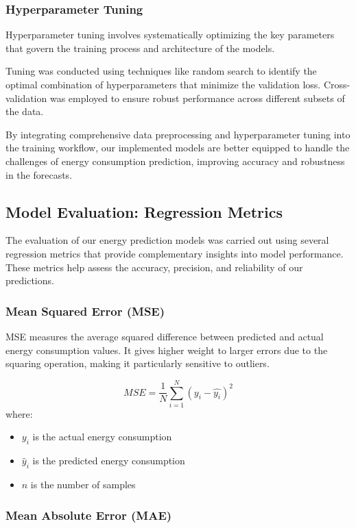 \subsubsection{Hyperparameter Tuning}

Hyperparameter tuning involves systematically optimizing the key parameters that govern the training process and architecture of the models. 

Tuning was conducted using techniques like random search to identify the optimal combination of hyperparameters that minimize the validation loss. Cross-validation was employed to ensure robust performance across different subsets of the data.

By integrating comprehensive data preprocessing and hyperparameter tuning into the training workflow, our implemented models are better equipped to handle the challenges of energy consumption prediction, improving accuracy and robustness in the forecasts.


\subsection{Model Evaluation: Regression Metrics}

The evaluation of our energy prediction models was carried out using several regression metrics that provide complementary insights into model performance. These metrics help assess the accuracy, precision, and reliability of our predictions.

\subsubsection{Mean Squared Error (MSE)}

MSE measures the average squared difference between predicted and actual energy consumption values. It gives higher weight to larger errors due to the squaring operation, making it particularly sensitive to outliers.

\[
    MSE = \frac{1}{N}\sum_{i=1}^{N}( y_i - \hat{y_i})^2
\]
where:

\begin{itemize}
    \item $y_i$ is the actual energy consumption
    \item $\hat{y}_i$ is the predicted energy consumption
    \item $n$ is the number of samples
\end{itemize}

\subsubsection{Mean Absolute Error (MAE)}

